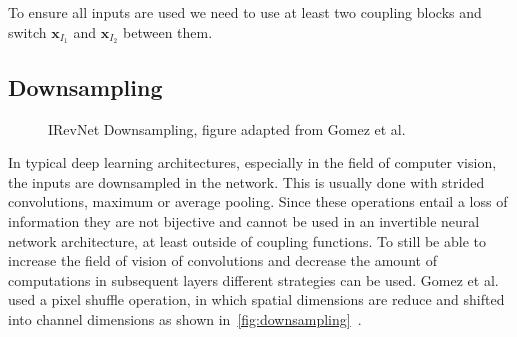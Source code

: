 To ensure all inputs are used we need to use at least two coupling blocks and
switch $\mathbf{x}_{I_1}$ and $\mathbf{x}_{I_2}$ between them.

\subsection{Downsampling}%
\label{sub:downsampling}

\begin{figure}[htpb]
\begin{center}
\end{center}
\caption{IRevNet Downsampling, figure adapted from Gomez et al.~\citep{gomezReversibleResidualNetwork2017}}%
\label{fig:downsampling}
\end{figure}

In typical deep learning architectures, especially in the field of computer
vision, the inputs are downsampled in the network. This is usually done with
strided convolutions, maximum or average pooling. Since these operations entail
a loss of information they are not bijective and cannot be used in an
invertible neural network architecture, at least outside of coupling functions.
To still be able to increase the field of vision of convolutions and decrease the
amount of computations in subsequent layers different strategies can be used. Gomez
et al. used a pixel shuffle operation, in which spatial dimensions are reduce and
shifted into channel dimensions as shown
in~\autoref{fig:downsampling}~\citep{gomezReversibleResidualNetwork2017}. 

